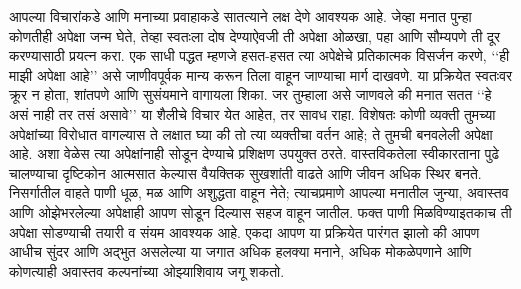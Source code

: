 आपल्या विचारांकडे आणि मनाच्या प्रवाहाकडे सातत्याने लक्ष देणे आवश्यक आहे. जेव्हा मनात पुन्हा कोणतीही अपेक्षा जन्म घेते, तेव्हा स्वतःला दोष देण्याऐवजी ती अपेक्षा ओळखा, पहा आणि सौम्यपणे ती दूर करण्यासाठी प्रयत्न करा. एक साधी पद्धत म्हणजे हसत-हसत त्या अपेक्षेचे प्रतिकात्मक विसर्जन करणे,  ‘‘ही माझी अपेक्षा आहे’’ असे जाणीवपूर्वक मान्य करून तिला वाहून जाण्याचा मार्ग दाखवणे. या प्रक्रियेत स्वतःवर क्रूर न होता, शांतपणे आणि सुसंयमाने वागायला शिका.
जर तुम्हाला असे जाणवले की मनात सतत ‘‘हे असं नाही तर तसं असावे’’ या शैलीचे विचार येत आहेत, तर सावध राहा. विशेषतः कोणी व्यक्ती तुमच्या अपेक्षांच्या विरोधात वागल्यास ते लक्षात घ्या की तो त्या व्यक्तीचा वर्तन आहे; ते तुमची बनवलेली अपेक्षा आहे. अशा वेळेस त्या अपेक्षांनाही सोडून देण्याचे प्रशिक्षण उपयुक्त ठरते. वास्तविकतेला स्वीकारताना पुढे चालण्याचा दृष्टिकोन आत्मसात केल्यास वैयक्तिक सुखशांती वाढते आणि जीवन अधिक स्थिर बनते.
निसर्गातील वाहते पाणी धूळ, मळ आणि अशुद्धता वाहून नेते; त्याचप्रमाणे आपल्या मनातील जुन्या, अवास्तव आणि ओझेभरलेल्या अपेक्षाही आपण सोडून दिल्यास सहज वाहून जातील. फक्त पाणी मिळविण्याइतकाच ती अपेक्षा सोडण्याची तयारी व संयम आवश्यक आहे. एकदा आपण या प्रक्रियेत पारंगत झालो की आपण आधीच सुंदर आणि अद्भुत असलेल्या या जगात अधिक हलक्या मनाने, अधिक मोकळेपणाने आणि कोणत्याही अवास्तव कल्पनांच्या ओझ्याशिवाय जगू शकतो.
